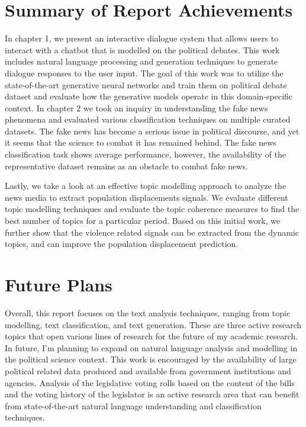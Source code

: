 \section{Summary of Report Achievements}
In chapter 1, we present an interactive dialogue system that allows users to interact with a chatbot that is modelled on the political debates. This work includes natural language processing and generation techniques to generate dialogue responses to the user input. The goal of this work was to utilize the state-of-the-art generative neural networks and train them on political debate dataset and evaluate how the generative models operate in this domain-specific context. In chapter 2 we took an inquiry in understanding the fake news phenomena and evaluated various classification techniques on multiple curated datasets. The fake news has become a serious issue in political discourse, and yet it seems that the science to combat it has remained behind. The fake news classification task shows average performance, however, the availability of the representative dataset remains as an obstacle to combat fake news.

Lastly, we take a look at an effective topic modelling approach to analyze the news media to extract population displacements signals. We evaluate different topic modelling techniques and evaluate the topic coherence measures to find the best number of topics for a particular period. Based on this initial work, we further show that the violence related signals can be extracted from the dynamic topics, and can improve the population displacement prediction. 


\section{Future Plans}
Overall, this report focuses on the text analysis techniques, ranging from topic modelling, text classification, and text generation. These are three active research topics that open various lines of research for the future of my academic research. In future, I'm planning to expand on natural language analysis and modelling in the political science context. This work is encouraged by the availability of large political related data produced and available from government institutions and agencies. Analysis of the legislative voting rolls based on the content of the bills and the voting history of the legislator is an active research area that can benefit from state-of-the-art natural language understanding and classification techniques. 